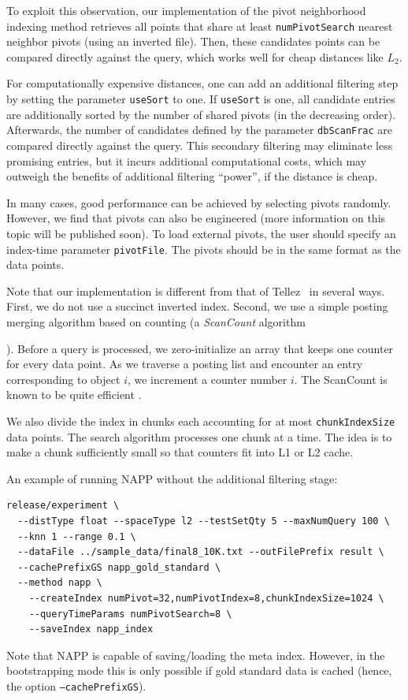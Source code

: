 \documentclass[runningheads,a4paper]{llncs}
\newcommand{\ttt}[1]{\texttt{#1}}
\begin{document}
{To exploit this observation, our implementation of the pivot neighborhood indexing method retrieves all points that 
share at least \ttt{numPivotSearch} nearest neighbor pivots (using an inverted file).
Then, these candidates points can be compared directly against the query,
which works well for cheap distances like $L_2$.

For computationally expensive distances, one can add an additional filtering step by
setting the parameter \ttt{useSort} to one.
If \ttt{useSort} is one, all candidate entries are additionally sorted by the number of shared pivots
(in the decreasing order).
Afterwards, the number of candidates defined by the parameter \ttt{dbScanFrac} are compared directly against the query. 
This secondary filtering may eliminate less promising entries, but it incurs additional
computational costs, which may outweigh the benefits of additional filtering ``power'', if the distance is cheap.

In many cases, good performance can be achieved by selecting pivots randomly. However, we find
that pivots can also be engineered (more information on this topic will be published soon). 
To load external pivots, the user should specify
an index-time parameter \ttt{pivotFile}. The pivots should be in the same format as the data points.

Note that our implementation is different from that of Tellez~\cite{tellez2013succinct} in several ways.
First, we do not use a succinct inverted index. Second, we use a simple posting merging algorithm
based on counting (a \emph{ScanCount} algorithm}). 
Before a query is processed, we zero-initialize an array that keeps one
counter for every data point. As we traverse a posting list and encounter an entry corresponding to object
$i$, we increment a counter number $i$.
The ScanCount is known to be quite efficient \cite{li2008efficient}.

We also divide the index in chunks each accounting for at most \ttt{chunkIndexSize} data points.
The search algorithm processes one chunk at a time. The idea is to make a chunk sufficiently small
so that counters fit into L1 or L2  cache.

An example of running NAPP without the additional filtering stage:
{
\footnotesize
\begin{verbatim}
release/experiment \
  --distType float --spaceType l2 --testSetQty 5 --maxNumQuery 100 \
  --knn 1 --range 0.1 \
  --dataFile ../sample_data/final8_10K.txt --outFilePrefix result \
  --cachePrefixGS napp_gold_standard \
  --method napp \
    --createIndex numPivot=32,numPivotIndex=8,chunkIndexSize=1024 \
    --queryTimeParams numPivotSearch=8 \
    --saveIndex napp_index
\end{verbatim}
}
Note that NAPP is capable of saving/loading the meta index. However, in the bootstrapping
mode this is only possible if gold standard data is cached (hence, the option \ttt{--cachePrefixGS}).
\end{document}
